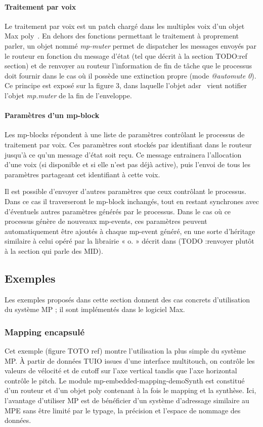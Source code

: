\paragraph{Traitement par voix}
Le traitement par voix est un patch chargé dans les multiples voix d'un objet Max poly~. En dehors des fonctions permettant le traitement à proprement parler, un objet nommé \textit{mp-muter} permet de dispatcher les messages envoyés par le routeur en fonction du message d'état (tel que décrit à la section TODO:ref section) et de renvoyer au routeur l'information de fin de tâche que le processus doit fournir dans le cas où il possède une extinction propre (mode \textit{@automute 0}). Ce principe est exposé sur la figure 3, dans laquelle l'objet adsr~ vient notifier l'objet \textit{mp.muter} de la fin de l'enveloppe.

\paragraph{Paramètres d'un mp-block}
Les mp-blocks répondent à une liste de paramètres contrôlant le processus de traitement par voix. Ces paramètres sont stockés par identifiant dans le routeur jusqu'à ce qu'un message d'état soit reçu. Ce message entrainera l'allocation d'une voix (si disponible et si elle n'est pas déjà active), puis l'envoi de tous les paramètres partageant cet identifiant à cette voix.
 
Il est possible d'envoyer d'autres paramètres que ceux contrôlant le processus. Dans ce cas il traverseront le mp-block inchangés, tout en restant synchrones avec d'éventuels autres paramètres générés par le processus. Dans le cas où ce processus génère de nouveaux mp-events, ces paramètres peuvent automatiquement être ajoutés à chaque mp-event généré, en une sorte d'héritage similaire à celui opéré par la librairie « o. » décrit dans \cite{goudard_dynamic_2011} (TODO :renvoyer plutôt à la section qui parle des MID).

\subsection{Exemples}
Les exemples proposés dans cette section donnent des cas concrets d'utilisation du système MP ; il sont implémentés dans le logiciel Max.
\subsubsection{Mapping encapsulé}
Cet exemple (figure TOTO ref) montre l'utilisation la plus simple du système MP. À partir de données TUIO issues d'une interface multitouch, on contrôle les valeurs de vélocité et de cutoff sur l'axe vertical tandis que l'axe horizontal contrôle le pitch.
Le module mp-embedded-mapping-demoSynth est constitué d'un routeur et d'un objet poly contenant à la fois le mapping et la synthèse. Ici, l'avantage d'utiliser MP est de bénéficier d'un système d'adressage similaire au \gls{MPE} sans être limité par le typage, la précision et l'espace de nommage des données.

